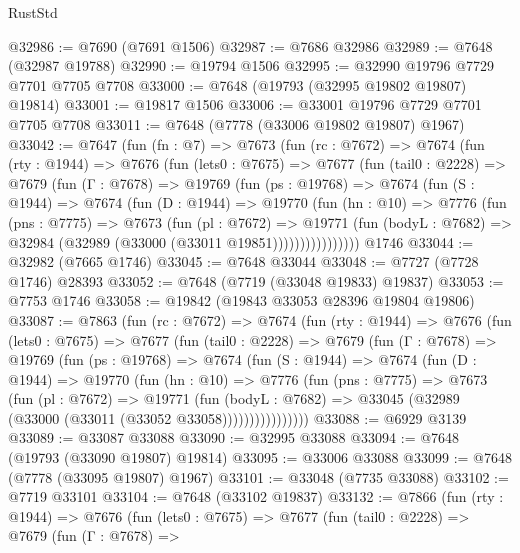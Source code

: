 \begin{lexlean}{RustStd}
\begin{coremodule}
{\begin{coremodule}
{{{{{{{{{{{{{{{{{{{{{{{{{{{{{{{{{{{{{{{{{{{{{{{{{{{{{@32986 := @7690 (@7691 @1506)
@32987 := @7686 @32986
@32989 := @7648 (@32987 @19788)
@32990 := @19794 @1506
@32995 := @32990 @19796 @7729 @7701 @7705 @7708
@33000 := @7648 (@19793 (@32995 @19802 @19807) @19814)
@33001 := @19817 @1506
@33006 := @33001 @19796 @7729 @7701 @7705 @7708
@33011 := @7648 (@7778 (@33006 @19802 @19807) @1967)
@33042 := @7647
    (fun (fn : @7) =>
    @7673
      (fun (rc : @7672) =>
      @7674
        (fun (rty : @1944) =>
        @7676
          (fun (lets0 : @7675) =>
          @7677
            (fun (tail0 : @2228) =>
            @7679
              (fun (Γ : @7678) =>
              @19769
                (fun (ps : @19768) =>
                @7674
                  (fun (S : @1944) =>
                  @7674
                    (fun (D : @1944) =>
                    @19770
                      (fun (hn : @10) =>
                      @7776
                        (fun (pns : @7775) =>
                        @7673
                          (fun (pl : @7672) =>
                          @19771
                            (fun (bodyL : @7682) =>
                            @32984 (@32989 (@33000 (@33011 @19851))))))))))))))))
    @1746
@33044 := @32982 (@7665 @1746)
@33045 := @7648 @33044
@33048 := @7727 (@7728 @1746) @28393
@33052 := @7648 (@7719 (@33048 @19833) @19837)
@33053 := @7753 @1746
@33058 := @19842 (@19843 @33053 @28396 @19804 @19806)
@33087 := @7863
    (fun (rc : @7672) =>
    @7674
      (fun (rty : @1944) =>
      @7676
        (fun (lets0 : @7675) =>
        @7677
          (fun (tail0 : @2228) =>
          @7679
            (fun (Γ : @7678) =>
            @19769
              (fun (ps : @19768) =>
              @7674
                (fun (S : @1944) =>
                @7674
                  (fun (D : @1944) =>
                  @19770
                    (fun (hn : @10) =>
                    @7776
                      (fun (pns : @7775) =>
                      @7673
                        (fun (pl : @7672) =>
                        @19771
                          (fun (bodyL : @7682) =>
                          @33045 (@32989 (@33000 (@33011 (@33052 @33058))))))))))))))))
@33088 := @6929 @3139
@33089 := @33087 @33088
@33090 := @32995 @33088
@33094 := @7648 (@19793 (@33090 @19807) @19814)
@33095 := @33006 @33088
@33099 := @7648 (@7778 (@33095 @19807) @1967)
@33101 := @33048 (@7735 @33088)
@33102 := @7719 @33101
@33104 := @7648 (@33102 @19837)
@33132 := @7866
    (fun (rty : @1944) =>
    @7676
      (fun (lets0 : @7675) =>
      @7677
        (fun (tail0 : @2228) =>
        @7679
          (fun (Γ : @7678) =>
}}}}}}}}}}}}}}}}}}}}}}}}}}}}}}}}}}}}}}}}}}}}}}}}}}}}}
\end{coremodule}}
\end{coremodule}
\end{lexlean}
